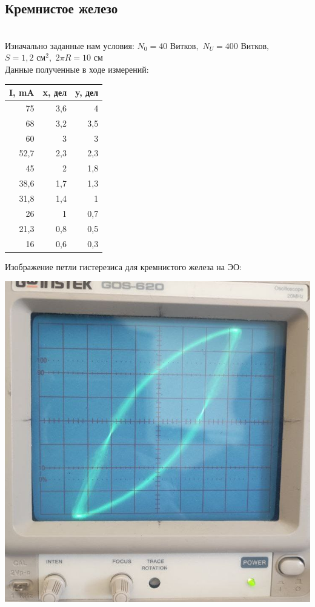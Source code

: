 \documentclass[a4paper, 12pt]{article}
\begin{document}
\subsection{Кремнистое железо}
\\ Изначально заданные нам условия: 
    $N_0 = 40 \text{ Витков},$ $ N_U = 400 \text{ Витков}, $ $ S = 1,2 \text{ см}^2, $ $ 2 \pi R = 10 \text{ см}$ \\
Данные полученные в ходе измерений:
\begin{center}
\begin{tabular}{|r|r|r|}
\hline
\multicolumn{1}{|l|}{I, mA} & \multicolumn{1}{l|}{x, дел} & \multicolumn{1}{l|}{y, дел} \\ \hline
75                          & 3,6                         & 4                           \\ \hline
68                          & 3,2                         & 3,5                         \\ \hline
60                          & 3                           & 3                           \\ \hline
52,7                        & 2,3                         & 2,3                         \\ \hline
45                          & 2                           & 1,8                         \\ \hline
38,6                        & 1,7                         & 1,3                         \\ \hline
31,8                        & 1,4                         & 1                           \\ \hline
26                          & 1                           & 0,7                         \\ \hline
21,3                        & 0,8                         & 0,5                         \\ \hline
16                          & 0,6                         & 0,3                         \\ \hline
\end{tabular}
\end{center}
Изображение петли гистерезиса для кремнистого железа на ЭО:
\begin{center}
    \includegraphics[width=0.5\linewidth]{Cremnistoe_iron.jpg}
    \caption{}
    \label{fig:enter-label}
\end{center}
\end{document}
